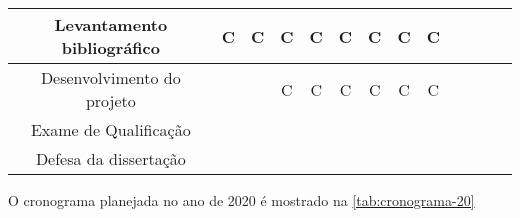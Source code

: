 \begin{table}[htb]
{\begin{tabular}{|c|c|c|c|c|c|c|c|c|c|c|c|c|}
			\hline
			Levantamento bibliográfico
			& \cellcolor[HTML]{9AFF99}C
			& \cellcolor[HTML]{9AFF99}C
			& \cellcolor[HTML]{9AFF99}C
			& \cellcolor[HTML]{9AFF99}C
			& \cellcolor[HTML]{9AFF99}C
			& \cellcolor[HTML]{9AFF99}C
			& \cellcolor[HTML]{9AFF99}C
			& \cellcolor[HTML]{9AFF99}C \\
			
			\hline
			Desenvolvimento do projeto
			&
			&
			& \cellcolor[HTML]{9AFF99}C
			& \cellcolor[HTML]{9AFF99}C
			& \cellcolor[HTML]{9AFF99}C
			& \cellcolor[HTML]{9AFF99}C
			& \cellcolor[HTML]{9AFF99}C
			& \cellcolor[HTML]{9AFF99}C \\ 
			
			\hline
			Exame de Qualificação
			&
			&
			&
			&
			&
			&
			&
			& \\
			
			\hline
			Defesa da dissertação
			&
			&
			&
			&
			&
			&
			&
			& \\
			\hline
			
		\end{tabular}}
	\end{table}

	O cronograma planejada no ano de 2020 é mostrado na \autoref{tab:cronograma-20}

